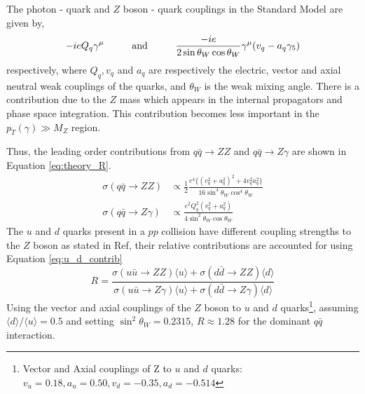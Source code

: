 \documentclass[11pt,a4paper,final]{report}
\begin{document}
The photon - quark and $Z$ boson - quark couplings in the Standard Model are given by,
\begin{equation}
	-ieQ_q\gamma^{\mu} \hspace{1 cm} \text{and} \hspace{1 cm}\frac{-ie}{2 \sin\theta_W \cos\theta_W}\gamma^{\mu}(v_q - a_q\gamma_5)
\end{equation}
respectively, where $Q_q,v_q$ and $a_q$ are respectively the electric, vector and axial neutral weak couplings of the quarks, and $\theta_W$ is the weak mixing angle. There is a contribution due to the $Z$ mass which appears in the internal propagators and phase space integration. This contribution becomes less important in the $p_T(\gamma)\gg M_Z$ region.

Thus, the leading order contributions from $q\bar{q}\rightarrow ZZ$ and $q\bar{q}\rightarrow Z\gamma$ are shown in Equation \ref{eq:theory_R}.
\begin{equation}
\begin{split}
	\sigma(q\bar{q}\rightarrow ZZ) &\propto \frac{1}{2}\frac{e^4\{(v_q^2 + a_q^2)^2 + 4v_q^2a_q^2\} }{16\sin^4\theta_W\cos^4\theta_W}\\[1.5ex]
	\sigma(q\bar{q}\rightarrow Z\gamma) &\propto \frac{e^2Q_q^2(v^2_q + a^2_q)}{4\sin^2\theta_W\cos\theta_W}
\end{split}
\label{eq:theory_R}
\end{equation}
The $u$ and $d$ quarks present in a $pp$ collision have different coupling strengths to the $Z$ boson as stated in Ref\cite{Z_coupling}, their relative contributions are accounted for using Equation \ref{eq:u_d_contrib}
\begin{equation}
R = \frac{\sigma(u\bar{u}\rightarrow ZZ)\langle u\rangle + \sigma(d\bar{d}\rightarrow ZZ)\langle d\rangle}{\sigma(u\bar{u}\rightarrow Z\gamma)\langle u\rangle + \sigma(d\bar{d}\rightarrow Z\gamma)\langle d\rangle}
\label{eq:u_d_contrib}
\end{equation}
Using the vector and axial couplings of the $Z$ boson to $u$ and $d$ quarks\footnote{Vector and Axial couplings of Z to $u$ and $d$ quarks: $v_u = 0.18, a_u = 0.50, v_d = -0.35, a_d = -0.514$}, assuming $\langle d \rangle/\langle u\rangle = 0.5$ and setting $\sin^2\theta_W = 0.2315$, $R\approx 1.28$ for the dominant $q\bar{q}$ interaction.
\end{document}
